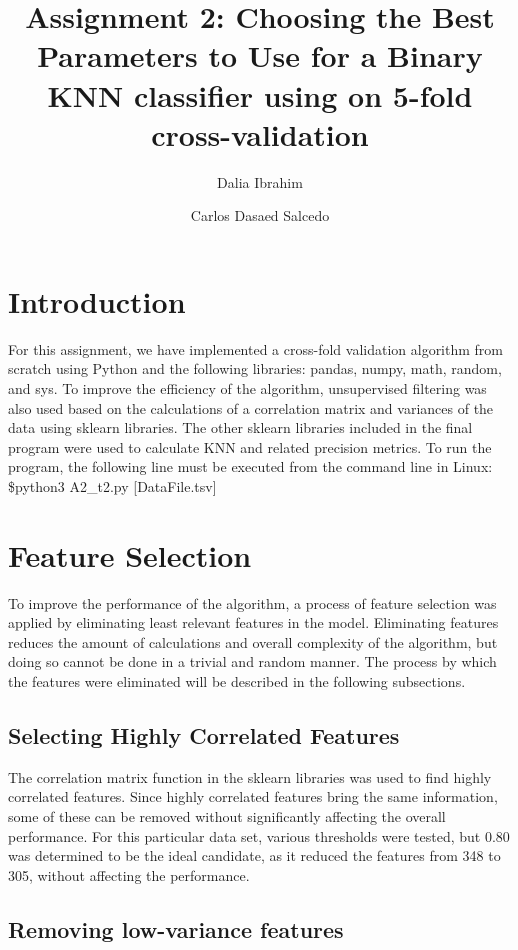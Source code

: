 \documentclass{article}
\author[1]{Dalia Ibrahim}
\author[2]{Carlos Dasaed Salcedo}
\affil[ ]{Studnet ID}
\affil[1]{201893217}
\affil[2]{201892008}
\begin{document}
  

\title{ Assignment 2: Choosing the Best Parameters to Use for a Binary KNN classifier using on 5-fold cross-validation}


\maketitle
 \section{Introduction}
For this assignment, we have implemented a cross-fold validation algorithm from scratch using Python and the following libraries: pandas, numpy, math, random, and sys. To improve the efficiency of the algorithm, unsupervised filtering was also used based on the calculations of a correlation matrix and variances of the data using sklearn libraries. The other sklearn libraries included in the final program were used to calculate KNN and related precision metrics. To run the program, the following line must be executed from the command line in Linux: \\
\$python3 A2\_t2.py [DataFile.tsv]

 \section{ Feature Selection}
To improve the performance of the algorithm, a process of feature selection was applied by eliminating least relevant features in the model. Eliminating features reduces the amount of calculations and overall complexity of the algorithm, but doing so cannot be done in a trivial and random manner. The process by which the features were eliminated will be described in the following subsections. 

\subsection{Selecting Highly Correlated Features}


The correlation matrix function in the sklearn libraries was used to find highly correlated features. Since highly correlated features bring the same information, some of these can be removed without significantly affecting the overall performance. For this particular data set, various thresholds were tested, but 0.80 was determined to be the ideal candidate, as it reduced the features from 348 to 305, without affecting the performance.
 
\subsection{Removing low-variance features}
\end{document}
